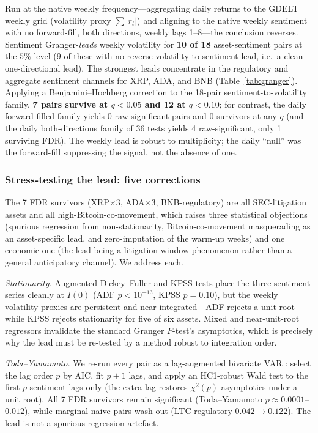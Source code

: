 \documentclass[pdflatex,sn-mathphys-num]{sn-jnl}
\theoremstyle{thmstyleone}
\theoremstyle{thmstyletwo}
\theoremstyle{thmstylethree}
\begin{document}
Run at the native weekly frequency---aggregating daily returns to the GDELT weekly grid (volatility proxy $\sum|r_t|$) and aligning to the native weekly sentiment with no forward-fill, both directions, weekly lags 1--8---the conclusion reverses. Sentiment Granger-\emph{leads} weekly volatility for \textbf{10 of 18} asset-sentiment pairs at the $5\%$ level (9 of these with no reverse volatility-to-sentiment lead, i.e.\ a clean one-directional lead). The strongest leads concentrate in the regulatory and aggregate sentiment channels for XRP, ADA, and BNB (Table~\ref{tab:granger}). Applying a Benjamini--Hochberg correction \citep{BenjaminiHochberg1995} to the 18-pair sentiment-to-volatility family, \textbf{7 pairs survive at $q<0.05$ and 12 at $q<0.10$}; for contrast, the daily forward-filled family yields 0 raw-significant pairs and 0 survivors at any $q$ (and the daily both-directions family of 36 tests yields 4 raw-significant, only 1 surviving FDR). The weekly lead is robust to multiplicity; the daily ``null'' was the forward-fill suppressing the signal, not the absence of one.

\subsubsection{Stress-testing the lead: five corrections}\label{sec:granger_rigour}

The 7 FDR survivors (XRP$\times 3$, ADA$\times 3$, BNB-regulatory) are all SEC-litigation assets and all high-Bitcoin-co-movement, which raises three statistical objections (spurious regression from non-stationarity, Bitcoin-co-movement masquerading as an asset-specific lead, and zero-imputation of the warm-up weeks) and one economic one (the lead being a litigation-window phenomenon rather than a general anticipatory channel). We address each.

\emph{Stationarity.} Augmented Dickey--Fuller \citep{DickeyFuller1979} and KPSS \citep{KPSS1992} tests place the three sentiment series cleanly at $I(0)$ (ADF $p<10^{-13}$, KPSS $p=0.10$), but the weekly volatility proxies are persistent and near-integrated---ADF rejects a unit root while KPSS rejects stationarity for five of six assets. Mixed and near-unit-root regressors invalidate the standard Granger $F$-test's asymptotics, which is precisely why the lead must be re-tested by a method robust to integration order.

\emph{Toda--Yamamoto.} We re-run every pair as a lag-augmented bivariate VAR \citep{TodaYamamoto1995}: select the lag order $p$ by AIC, fit $p+1$ lags, and apply an HC1-robust Wald test to the first $p$ sentiment lags only (the extra lag restores $\chi^2(p)$ asymptotics under a unit root). All 7 FDR survivors remain significant (Toda--Yamamoto $p\approx 0.0001$--$0.012$), while marginal naive pairs wash out (LTC-regulatory $0.042\to 0.122$). The lead is not a spurious-regression artefact.
\end{document}
